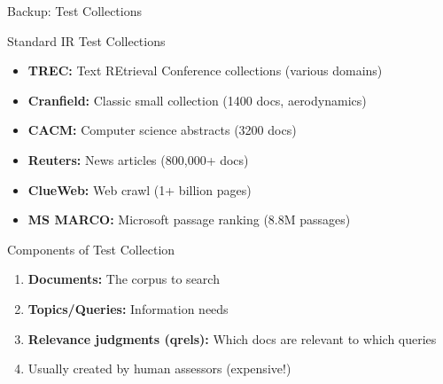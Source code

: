 \documentclass[aspectratio=169]{beamer}
\newif\ifanimated
\newcommand{\cpause}{\ifanimated\pause\fi}
\begin{document}
\begin{frame}[shrink=15]{Backup: Test Collections}
\begin{block}{Standard IR Test Collections}
\begin{itemize}
    \item \textbf{TREC:} Text REtrieval Conference collections (various domains)
    \item \textbf{Cranfield:} Classic small collection (1400 docs, aerodynamics)
    \item \textbf{CACM:} Computer science abstracts (3200 docs)
    \item \textbf{Reuters:} News articles (800,000+ docs)
    \item \textbf{ClueWeb:} Web crawl (1+ billion pages)
    \item \textbf{MS MARCO:} Microsoft passage ranking (8.8M passages)
\end{itemize}
\cpause
\end{block}
\cpause
\begin{block}{Components of Test Collection}
\begin{enumerate}
    \item \textbf{Documents:} The corpus to search
    \item \textbf{Topics/Queries:} Information needs
    \item \textbf{Relevance judgments (qrels):} Which docs are relevant to which queries
    \item Usually created by human assessors (expensive!)
\end{enumerate}
\end{block}
\end{frame}
\end{document}
